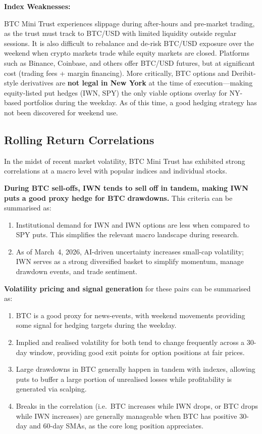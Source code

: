 \documentclass[11pt,letterpaper]{article}
\begin{document}
\medskip
\noindent\textbf{Index Weaknesses:}

\medskip
\noindent BTC Mini Trust experiences slippage
during after-hours and pre-market trading, as the trust must track to
BTC/USD with limited liquidity outside regular sessions. It is also
difficult to rebalance and de-risk BTC/USD exposure over the weekend when
crypto markets trade while equity markets are closed. Platforms such as
Binance, Coinbase, and others offer BTC/USD futures, but at significant
cost (trading fees + margin financing). More critically, BTC options and
Deribit-style derivatives are \textbf{not legal in New York} at the time of
execution---making equity-listed put hedges (IWN, SPY) the only viable
options overlay for NY-based portfolios during the weekday. As of this time,
a good hedging strategy has not been discovered for weekend use.

\subsection{Rolling Return Correlations}

In the midst of recent market volatility, BTC Mini Trust has exhibited
strong correlations at a macro level with popular indices and individual
stocks.

\medskip
\textbf{During BTC sell-offs, IWN tends to sell off in tandem, making IWN puts a
good proxy hedge for BTC drawdowns.} This criteria can be summarised as:

\begin{enumerate}[itemsep=4pt]
  \item Institutional demand for IWN and IWN options are less when compared
        to SPY puts. This simplifies the relevant macro landscape during
        research.
  \item As of March~4, 2026, AI-driven uncertainty increases small-cap
        volatility; IWN serves as a strong diversified basket to simplify
        momentum, manage drawdown events, and trade sentiment.
\end{enumerate}

\textbf{Volatility pricing and signal generation} for these pairs can be summarised as:

\begin{enumerate}[itemsep=4pt]
  \item BTC is a good proxy for news-events, with weekend movements
        providing some signal for hedging targets during the weekday.
  \item Implied and realised volatility for both tend to change frequently
        across a 30-day window, providing good exit points for option
        positions at fair prices.
  \item Large drawdowns in BTC generally happen in tandem with indexes,
        allowing puts to buffer a large portion of unrealised losses while
        profitability is generated via scalping.
  \item Breaks in the correlation (i.e.\ BTC increases while IWN drops, or
        BTC drops while IWN increases) are generally manageable when BTC has
        positive 30-day and 60-day SMAs, as the core long position
        appreciates.
\end{enumerate}
\end{document}
